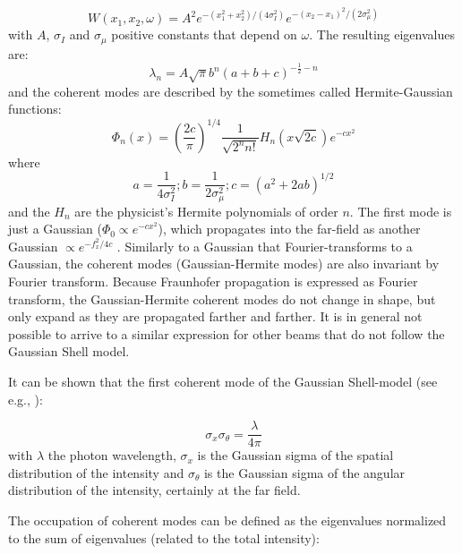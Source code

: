 \documentclass{iucr}              %
\begin{document}
\begin{equation}
W(x_1,x_2,\omega) = A^2 e^{-(x_1^2+x_2^2)/(4 \sigma_I^2)} e^{-(x_2-x_1)^2/(2 \sigma_{\mu}^2)}
\label{GS_CSD}
\end{equation}
with $A$, $\sigma_I$ and $\sigma_{\mu}$ positive constants that depend on $\omega$.
The resulting \cite{Starikov82,mandel_wolf} eigenvalues are:
\begin{equation}
\lambda_n = A \sqrt{\pi} b^n (a+b+c)^{-\frac{1}{2}-n}
\label{GS_eigenvalues}
\end{equation}
and the coherent modes are described by the sometimes called Hermite-Gaussian functions:
\begin{equation}
\Phi_n(x) = \left( \frac{2c}{\pi} \right)^{1/4} \frac{1}{\sqrt{2^n n!}} H_n(x\sqrt{2c})e^{-cx^2}
\label{GSeigenvalues}
\end{equation}
where 
\begin{equation}
a = \frac{1}{4 \sigma_I^2}; 
b = \frac{1}{2 \sigma_{\mu}^2}; 
c = (a^2 + 2 a b)^{1/2} %
\end{equation}
and the $H_n$ are the physicist's Hermite polynomials of order $n$. 
The first mode is just a Gaussian ($\Phi_0 \propto e^{-cx^2}$), which propagates into the far-field as another Gaussian $ \propto e^{-f_x^2/4c}$ .
Similarly to a Gaussian that Fourier-transforms to a Gaussian, the coherent modes (Gaussian-Hermite modes) are also invariant by Fourier transform. Because Fraunhofer propagation is expressed as Fourier transform, the Gaussian-Hermite coherent modes do not change in shape, but only expand as they are propagated farther and farther. It is in general not possible to arrive to a similar expression for other beams that do not follow the Gaussian Shell model. 

It can be shown that the first coherent mode of the Gaussian Shell-model (see e.g., \cite{Siegman_1990}): 

\begin{equation}
\sigma_x \sigma_{\theta} = \frac{\lambda}{4 \pi}
\label{sigmasigmaprime}
\end{equation}
with $\lambda$ the photon wavelength, $\sigma_x$ is the Gaussian sigma of the spatial distribution of the intensity and $\sigma_{\theta}$ is the Gaussian sigma of the angular distribution of the intensity, certainly at the far field. 

The occupation of coherent modes can be defined as the eigenvalues normalized to the sum of eigenvalues (related to the total intensity): 
\end{document}
